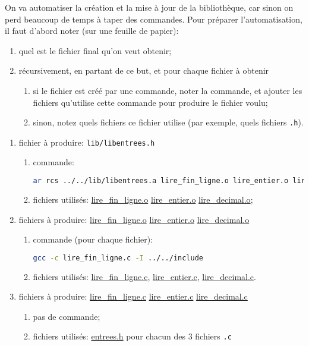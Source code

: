 \question On va automatiser la création et la mise à jour de la
bibliothèque, car sinon on perd beaucoup de temps à taper des
commandes. Pour préparer l'automatisation, il faut d'abord noter (sur
une feuille de papier):
\begin{enumerate}
\item quel est le fichier final qu'on veut obtenir;
\item récursivement, en partant de ce but, et pour chaque fichier à obtenir
  \begin{enumerate}
  \item si le fichier est créé par une commande, noter la commande, et
    ajouter les fichiers qu'utilise cette commande pour produire le
    fichier voulu;
  \item sinon, notez quels fichiers ce fichier utilise (par exemple,
    quels fichiers \texttt{.h}).
  \end{enumerate}
\end{enumerate}

\begin{solution}
  \begin{enumerate}
  \item fichier à produire: \texttt{lib/libentrees.h}
    \begin{enumerate}
    \item commande:
      \begin{lstlisting}[language=bash]
        ar rcs ../../lib/libentrees.a lire_fin_ligne.o lire_entier.o lire_decimal.o
      \end{lstlisting}
    \item fichiers utilisés: \url{lire_fin_ligne.o}
      \url{lire_entier.o} \url{lire_decimal.o};
    \end{enumerate} 
  \item fichiers à produire: \url{lire_fin_ligne.o} \url{lire_entier.o}
    \url{lire_decimal.o}
    \begin{enumerate}
    \item commande (pour chaque fichier):
      \begin{lstlisting}[language=bash]
        gcc -c lire_fin_ligne.c -I ../../include
      \end{lstlisting}
    \item fichiers utilisés: \url{lire_fin_ligne.c}, \url{lire_entier.c},
      \url{lire_decimal.c}.
    \end{enumerate} 
  \item fichiers à produire: \url{lire_fin_ligne.c} \url{lire_entier.c}
    \url{lire_decimal.c}
    \begin{enumerate}
    \item pas de commande;
    \item fichiers utilisés: \url{entrees.h} pour chacun des 3 fichiers \texttt{.c}
    \end{enumerate} 
  \end{enumerate}
\end{solution}


